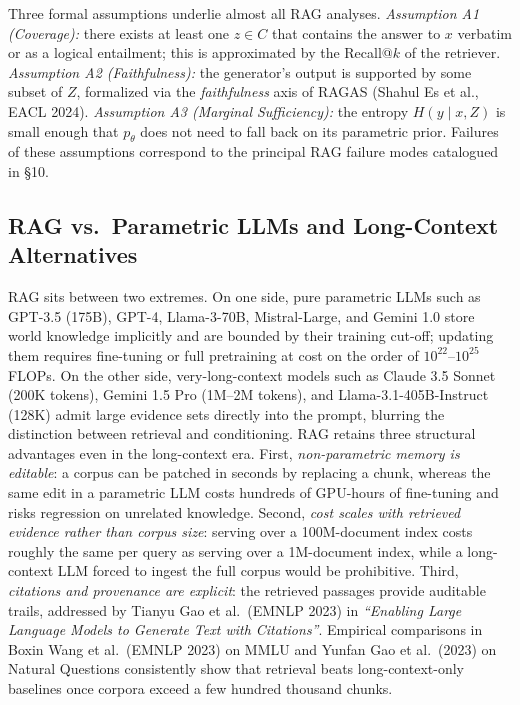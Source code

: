 \documentclass{article}
\begin{document}
Three formal assumptions underlie almost all RAG analyses. \emph{Assumption A1 (Coverage):} there exists at least one \(z \in C\) that contains the answer to \(x\) verbatim or as a logical entailment; this is approximated by the Recall@\(k\) of the retriever. \emph{Assumption A2 (Faithfulness):} the generator's output is supported by some subset of \(Z\), formalized via the \emph{faithfulness} axis of RAGAS (Shahul Es et al., EACL 2024). \emph{Assumption A3 (Marginal Sufficiency):} the entropy \(H(y \mid x, Z)\) is small enough that \(p_\theta\) does not need to fall back on its parametric prior. Failures of these assumptions correspond to the principal RAG failure modes catalogued in §10.

\subsection{RAG vs.~Parametric LLMs and Long-Context Alternatives}\label{rag-vs.-parametric-llms-and-long-context-alternatives}

RAG sits between two extremes. On one side, pure parametric LLMs such as GPT-3.5 (175B), GPT-4, Llama-3-70B, Mistral-Large, and Gemini 1.0 store world knowledge implicitly and are bounded by their training cut-off; updating them requires fine-tuning or full pretraining at cost on the order of \(10^{22}\)--\(10^{25}\) FLOPs. On the other side, very-long-context models such as Claude 3.5 Sonnet (200K tokens), Gemini 1.5 Pro (1M--2M tokens), and Llama-3.1-405B-Instruct (128K) admit large evidence sets directly into the prompt, blurring the distinction between retrieval and conditioning. RAG retains three structural advantages even in the long-context era. First, \emph{non-parametric memory is editable}: a corpus can be patched in seconds by replacing a chunk, whereas the same edit in a parametric LLM costs hundreds of GPU-hours of fine-tuning and risks regression on unrelated knowledge. Second, \emph{cost scales with retrieved evidence rather than corpus size}: serving over a 100M-document index costs roughly the same per query as serving over a 1M-document index, while a long-context LLM forced to ingest the full corpus would be prohibitive. Third, \emph{citations and provenance are explicit}: the retrieved passages provide auditable trails, addressed by Tianyu Gao et al.~(EMNLP 2023) in \emph{``Enabling Large Language Models to Generate Text with Citations''}. Empirical comparisons in Boxin Wang et al.~(EMNLP 2023) on MMLU and Yunfan Gao et al.~(2023) on Natural Questions consistently show that retrieval beats long-context-only baselines once corpora exceed a few hundred thousand chunks.
\end{document}
